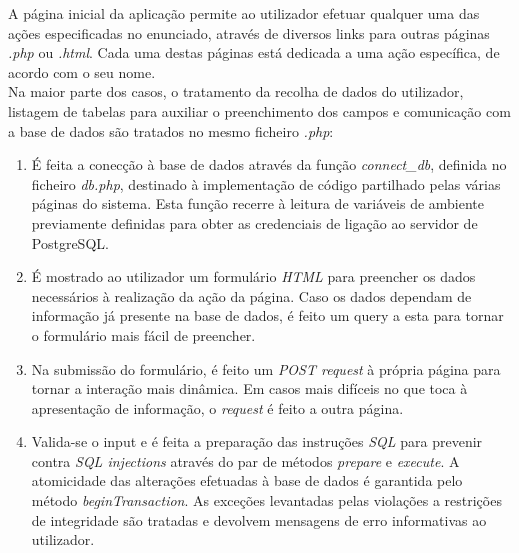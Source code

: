 \documentclass[12pt]{report}
\begin{document}
    \normalsize
    \vspace{2mm}

    \hspace*{1em}
    A página inicial da aplicação permite ao utilizador efetuar qualquer uma das ações especificadas no enunciado, através de diversos links para outras páginas \textit{.php} ou \textit{.html}. Cada uma destas páginas está dedicada a uma ação específica, de acordo com o seu nome. \\

    \hspace*{1em} Na maior parte dos casos, o tratamento da recolha de dados do utilizador, listagem de tabelas para auxiliar o preenchimento dos campos e comunicação com a base de dados são tratados no mesmo ficheiro \textit{.php}:
    \\
    \begin{enumerate}
        \item É feita a conecção à base de dados através da função \textit{connect\_db}, definida no ficheiro \textit{db.php}, destinado à implementação de código partilhado pelas várias páginas do sistema. Esta função recerre à leitura de variáveis de ambiente previamente definidas para obter as credenciais de ligação ao servidor de PostgreSQL.
        \item É mostrado ao utilizador um formulário \textit{HTML} para preencher os dados necessários à realização da ação da página. Caso os dados dependam de informação já presente na base de dados, é feito um query a esta para tornar o formulário mais fácil de preencher.
        \item Na submissão do formulário, é feito um \textit{POST request} à própria página para tornar a interação mais dinâmica. Em casos mais difíceis no que toca à apresentação de informação, o \textit{request} é feito a outra página.
        \item Valida-se o input e é feita a preparação das instruções \textit{SQL} para prevenir contra \textit{SQL injections} através do par de métodos \textit{prepare} e \textit{execute}. A atomicidade das alterações efetuadas à base de dados é garantida pelo método \textit{beginTransaction}. As exceções levantadas pelas violações a restrições de integridade são tratadas e devolvem mensagens de erro informativas ao utilizador.
    \end{enumerate}




\end{document}
